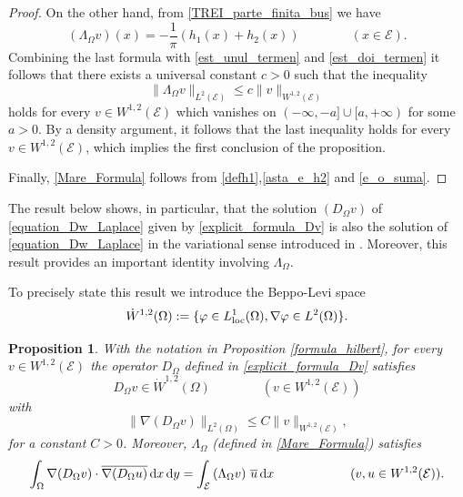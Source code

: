 \documentclass{amsart} %
\numberwithin{equation}{section}
\newtheorem{proposition}[theorem]{Proposition}
\theoremstyle{definition}
\begin{document}
\begin{proof}
On the other hand, from \eqref{TREI_parte_finita_bus} we have
\begin{equation}\label{e_o_suma}
\left(\Lambda_\Omega v\right)(x)=-\frac{1}{\pi}(h_1(x) + h_2(x)) \qquad\qquad(x\in \mathcal{E}).
\end{equation}
Combining the last formula with \eqref{est_unul_termen} and \eqref{est_doi_termen} it follows that there exists a universal
constant $c>0$ such that the inequality
$$
\|\Lambda_\Omega v\|_{L^2(\mathcal{E})} \leqslant c\|v\|_{W^{1,2}(\mathcal{E})}
$$
holds for every $v\in W^{1,2}(\mathcal{E})$ which vanishes on $(-\infty,-a]\cup [a,+\infty)$ for some $a>0$.
By a density argument, it follows that the last inequality holds for every $v\in W^{1,2}(\mathcal{E})$, which implies the first conclusion of the proposition.

Finally, \eqref{Mare_Formula} follows from \eqref{defh1},\eqref{asta_e_h2} and \eqref{e_o_suma}.
\end{proof}

The result below shows, in particular, that the solution $(D_\Omega v)$ of \eqref{equation_Dw_Laplace} given by \eqref{explicit_formula_Dv}
is also the solution of \eqref{equation_Dw_Laplace} in the variational sense introduced in \cite{lannes2024posednessfjohnsfloating}. Moreover, this result provides an important identity involving $\Lambda_\Omega $.

To precisely state this result we introduce the Beppo-Levi space 
$$
\dot{W}^{1,2}(\Omega) := \{\varphi \in  L_{\rm loc}^1(\Omega), \nabla \varphi \in L^2(\Omega)\}.
$$

\begin{proposition}\label{prop_var}
With the notation in Proposition \ref{formula_hilbert}, for every $v\in W^{1,2}(\mathcal{E})$ the operator $D_\Omega$ defined in \eqref{explicit_formula_Dv} satisfies
\begin{equation}\label{cu_beppo}
D_\Omega v\in \dot{W}^{1,2}(\Omega) \qquad\qquad(v\in W^{1,2}(\mathcal{E}))
\end{equation}
with
\begin{equation}\label{gradient_bound}
    \|\nabla(D_{\Omega}v)\|_{L^2(\Omega)}\leqslant C \|v\|_{W^{1,2}(\mathcal{E})},
\end{equation}
for a constant $C>0$. Moreover, $\Lambda_\Omega$ (defined in \eqref{Mare_Formula}) satisfies
\begin{equation}\label{cu_Omega}
\int_\Omega \nabla(D_\Omega v)\cdot \overline{\nabla (D_\Omega u)} \, {\rm d}x\, {\rm d}y=\int_\mathcal{E} \left(\Lambda_\Omega v\right)\, \overline u \, {\rm d}x
\qquad\qquad\qquad(v, u\in W^{1,2}(\mathcal{E})).
\end{equation}
\end{proposition}
\end{document}
